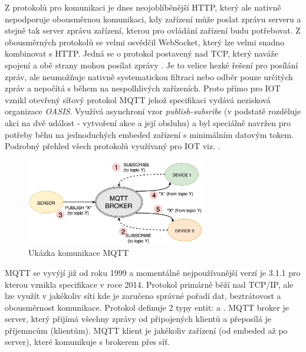 Z protokolů pro komunikaci je dnes neojoblíběnější HTTP, který ale nativně nepodporuje obousměrnou komunikaci, kdy zařízení může poslat zprávu serveru a stejně tak server zprávu zařízení, kterou pro ovládání zařízení budu potřebovat. Z obousměrných protokolů se velmi osvědčil WebSocket, který lze velmi snadno kombinovat s HTTP. Jedná se o protokol postavený nad TCP, který naváže spojení a obě strany mohou posílat zprávy \cite{websocket}. Je to velice hezké řešení pro posílání zpráv, ale neumožňuje nativně systematickou filtraci nebo odběr pouze určitých zpráv a nepočítá s během na nespolhlivých zařízeních. Proto přímo pro IOT vznikl otevřený síťový protokol MQTT jehož specifikaci vydává nezisková organizace \textit{OASIS}. Využívá asynchroní vzor \textit{publish-subsribe} (v podstatě rozděluje akci na dvě událost - vytvoření akce a její obsluhu) a byl speciálně navržen pro potřeby běhu na jednoduchých embeded zařízení s minimálním datovým tokem. Podrobný přehled všech protokolů využívaný pro IOT viz. \cite{protocols}.

\begin{figure}[htbp]
    \centering
    \includegraphics[width=0.7\textwidth]{img/mqtt-communication.jpeg}
    \caption{Ukázka komunikace MQTT \cite{img-mqtt-communication}}
\end{figure}

\label{mqtt-description}
MQTT se vyvýjí již od roku 1999 a momentálně nejpoužívanější verzí je 3.1.1 pro kterou vznikla specifikace v roce 2014. Protokol primárně běží nad TCP/IP, ale lze využít v jakékoliv síti kde je zaručeno správné pořadí dat, beztrátovost a obousměrnost komunikace. Protokol definuje 2 typy entit:  a . MQTT broker je server, který přijímá všechny zprávy od připojených klientů a přeposílá je příjemncům (klientům). MQTT klient je jakékoliv zařízení (od embeded až po server), které komunikuje s brokerem přes síť. \cite{mqtt}

